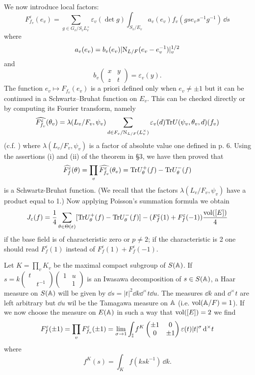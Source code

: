 We now introduce local factors:
\[
F_{f_v}^{\varepsilon}(e_v) = \sum_{g \in G_v / S_v L_v^\times} \varepsilon_v(\det g) \int_{S_v / E_v} a_v(e_v) f_v(gse_v s^{-1}g^{-1})\, \dd s
\]
where
\[
a_v(e_v) = b_v(e_v) |\mathrm{N}_{L/F}(e_v - e_v^{-1})|_v^{1/2}
\]
and
\[
b_v\begin{pmatrix}
    x & y \\ z & t
\end{pmatrix} = \varepsilon_v(y).
\]
The function $e_v \mapsto F_{f_v}(e_v)$ is a priori defined only when $e_v \ne \pm 1$ but it can be continued in a Schwartz--Bruhat function on $E_v$.
This can be checked directly or by computing its Fourier transform, namely
\[
\widehat{F_{f_v}^{\varepsilon}}(\theta_v) = \lambda(L_v / F_v, \psi_v) \sum_{d \in F_v / \mathrm{N}_{L/F}(L_v^\times)} \varepsilon_v(d) \mathrm{Tr} U(\psi_v, \theta_v, d)(f_v)
\]
(c.f. \cite{gelfand1966}) where $\lambda(L_v / F_v, \psi_v)$ is a factor of absolute value one defined in \cite{jacquet1970automorphic} p. 6. Using the assertions (i) and (ii) of the theorem in \S 3, we have then proved that
\[
\widehat{F_{f}^{\varepsilon}}(\theta) = \prod_v \widehat{F_{f_v}^{\varepsilon}}(\theta_v) = \mathrm{Tr} U^+_\theta(f) - \mathrm{Tr} U^-_\theta(f)
\]
is a Schwartz-Bruhat function. (We recall that the factors $\lambda(L_v / F_v, \psi_v)$ have a product equal to 1.)
Now applying Poisson's summation formula we obtain
\[
J_\varepsilon(f) = \frac{1}{4} \sum_{\theta \in \Theta(\varepsilon)} [\mathrm{Tr} U^+_\theta(f) - \mathrm{Tr} U^-_\theta(f)] - (F_f^{\varepsilon}(1) + F_f^{\varepsilon}(-1)) \frac{\mathrm{vol}([E])}{4}
\]
if the base field is of characteristic zero or $p \ne 2$; if the characteristic is 2 one should read $F^{\varepsilon}_f(1)$ instead of $F^{\varepsilon}_f(1) + F^{\varepsilon}_f(-1)$.

Let $K = \prod_v K_v$ be the maximal compact subgroup of $S(\mathbb{A})$.
If $s = k \left(\begin{smallmatrix}
    t & \\ & t^{-1}
\end{smallmatrix}\right) \left( \begin{smallmatrix}
    1 & u \\ & 1
\end{smallmatrix}\right)$ is an Iwasawa decomposition of $s \in S(\mathbb{A})$, a Haar measure on $S(\mathbb{A})$ will be given by $\dd s = |t|^2\dd k \dd^\times t \dd u$.
The measures $\dd k$ and $\dd^\times t$ are left arbitrary but $\dd u$ wil be the Tamagawa measure on $\mathbb{A}$ (i.e. $\mathrm{vol}(\mathbb{A}/ F) = 1$).
If we now choose the measure on $E(\mathbb{A})$ in such a way that $\mathrm{vol}([E]) = 2$ we find
\[
F_f^{\varepsilon}(\pm 1) = \prod_v F_{f_v}^{\varepsilon}(\pm 1) = \lim_{\sigma \to 1} \int_{\mathbb{I}} f^{K} \begin{pmatrix} \pm 1 & 0 \\ 0 & \pm 1 \end{pmatrix} \varepsilon(t) |t|^{\sigma} \, \mathrm{d}^\times t
\]
where
\[
f^K(s) = \int_{K} f(ksk^{-1}) \, \dd k.
\]

